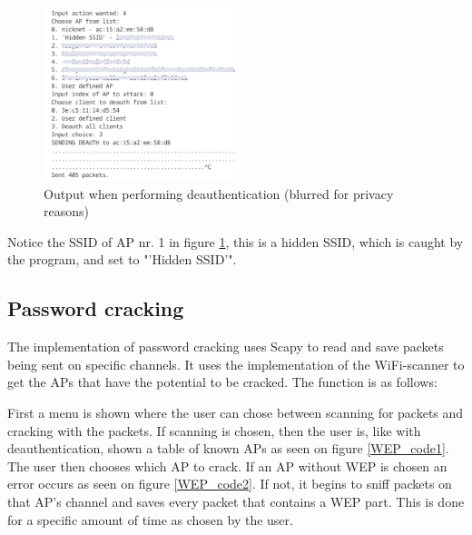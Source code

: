 \begin{figure}[H]
    \centering
    \includegraphics[width=0.5\textwidth]{Latex-Files/Billeder/Implementation/deauth_attack_censored.png}
    \caption{Output when performing deauthentication (blurred for privacy reasons)}
    \label{deauth_attack}
\end{figure}

Notice the SSID of AP nr. 1 in figure \ref{deauth_attack}, this is a hidden SSID, which is caught by the program, and set to "'Hidden SSID'".

\subsection{Password cracking}
The implementation of password cracking uses Scapy to read and save packets being sent on specific channels. It uses the implementation of the WiFi-scanner to get the APs that have the potential to be cracked. The function is as follows:

First a menu is shown where the user can chose between scanning for packets and cracking with the packets. If scanning is chosen, then the user is, like with deauthentication, shown a table of known APs as seen on figure \ref{WEP_code1}. The user then chooses which AP to crack. If an AP without WEP is chosen an error occurs as seen on figure \ref{WEP_code2}. If not, it begins to sniff packets on that AP's channel and saves every packet that contains a WEP part. This is done for a specific amount of time as chosen by the user. 

